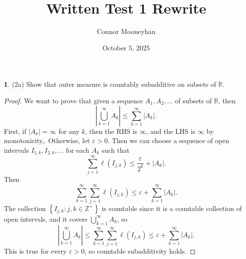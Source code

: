 \documentclass[12pt]{article}
\title{Written Test 1 Rewrite}
\author{Connor Mooneyhan}
\date{October 5, 2025}
\theoremstyle{definition}
\newtheorem{ex}{}
\begin{document}
\maketitle

\begin{ex}
	(2a)
	Show that outer measure is countably subadditive on subsets of $\mathbb{R}$.
\end{ex}
\begin{proof}
	We want to prove that given a sequence $A_1, A_2, \dots$ of subsets of $\mathbb{R}$, then \begin{equation*}
		\left| \bigcup_{k=1}^\infty A_k \right| \leq \sum_{k=1}^\infty |A_k|.
	\end{equation*}
	First, if $|A_k| = \infty$ for any $k$, then the RHS is $\infty$, and the LHS is $\infty$ by monotonicity,.
	Otherwise, let $\varepsilon > 0$.
	Then we can choose a sequence of open intervals $I_{1,k}, I_{2,k}, \dots$ for each $A_k$ such that \begin{equation*}
		\sum_{j=1}^\infty \ell(I_{j,k}) \leq \frac{\varepsilon}{2^k} + |A_k|.
	\end{equation*}
	Then \begin{equation*}
		\sum_{k=1}^\infty\sum_{j=1}^\infty \ell(I_{j,k}) \leq \varepsilon + \sum_{k=1}^\infty|A_k|.
	\end{equation*}
	The collection $\left\lbrace I_{j,k} : j, k \in \mathbb{Z}^+ \right\rbrace$ is countable since it is a countable collection of open intervals, and it covers $\bigcup_{k=1}^\infty A_k$, so \begin{equation*}
		\left|\bigcup_{k=1}^\infty A_k\right| \leq \sum_{k=1}^\infty\sum_{j=1}^\infty \ell(I_{j,k}) \leq \varepsilon + \sum_{k=1}^\infty|A_k|.
	\end{equation*}
	This is true for every $\varepsilon > 0$, so countable subadditivity holds.
\end{proof}

\end{document}
